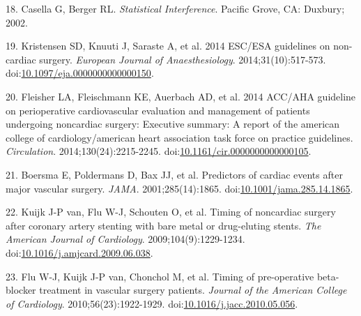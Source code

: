 \documentclass[]{article}
\begin{document}
\hypertarget{ref-casella2002}{}
18. Casella G, Berger RL. \emph{Statistical Interference}. Pacific
Grove, CA: Duxbury; 2002.

\hypertarget{ref-Kristensen_2014}{}
19. Kristensen SD, Knuuti J, Saraste A, et al. 2014 ESC/ESA guidelines
on non-cardiac surgery. \emph{European Journal of Anaesthesiology}.
2014;31(10):517-573.
doi:\href{https://doi.org/10.1097/eja.0000000000000150}{10.1097/eja.0000000000000150}.

\hypertarget{ref-Fleisher_2014}{}
20. Fleisher LA, Fleischmann KE, Auerbach AD, et al. 2014 ACC/AHA
guideline on perioperative cardiovascular evaluation and management of
patients undergoing noncardiac surgery: Executive summary: A report of
the american college of cardiology/american heart association task force
on practice guidelines. \emph{Circulation}. 2014;130(24):2215-2245.
doi:\href{https://doi.org/10.1161/cir.0000000000000105}{10.1161/cir.0000000000000105}.

\hypertarget{ref-Boersma_2001}{}
21. Boersma E, Poldermans D, Bax JJ, et al. Predictors of cardiac events
after major vascular surgery. \emph{JAMA}. 2001;285(14):1865.
doi:\href{https://doi.org/10.1001/jama.285.14.1865}{10.1001/jama.285.14.1865}.

\hypertarget{ref-van_Kuijk_2009}{}
22. Kuijk J-P van, Flu W-J, Schouten O, et al. Timing of noncardiac
surgery after coronary artery stenting with bare metal or drug-eluting
stents. \emph{The American Journal of Cardiology}.
2009;104(9):1229-1234.
doi:\href{https://doi.org/10.1016/j.amjcard.2009.06.038}{10.1016/j.amjcard.2009.06.038}.

\hypertarget{ref-Flu_2010}{}
23. Flu W-J, Kuijk J-P van, Chonchol M, et al. Timing of pre-operative
beta-blocker treatment in vascular surgery patients. \emph{Journal of
the American College of Cardiology}. 2010;56(23):1922-1929.
doi:\href{https://doi.org/10.1016/j.jacc.2010.05.056}{10.1016/j.jacc.2010.05.056}.
\end{document}
